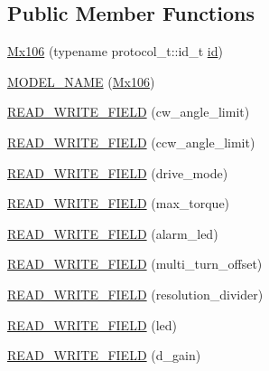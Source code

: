 \subsection*{Public Member Functions}
\begin{DoxyCompactItemize}
\item 
\hyperlink{classdynamixel_1_1servos_1_1_mx106_a184741dcdff7d84954ade3e11991950d}{Mx106} (typename protocol\+\_\+t\+::id\+\_\+t \hyperlink{classdynamixel_1_1servos_1_1_servo_a2d022081672e25a7bb57b76706e1cc57}{id})
\item 
\hyperlink{classdynamixel_1_1servos_1_1_mx106_a62132a7010a8803253cd6733c2a4c348}{M\+O\+D\+E\+L\+\_\+\+N\+A\+M\+E} (\hyperlink{classdynamixel_1_1servos_1_1_mx106}{Mx106})
\item 
\hyperlink{classdynamixel_1_1servos_1_1_mx106_a51923345707aaaf521c92db51b046ad3}{R\+E\+A\+D\+\_\+\+W\+R\+I\+T\+E\+\_\+\+F\+I\+E\+L\+D} (cw\+\_\+angle\+\_\+limit)
\item 
\hyperlink{classdynamixel_1_1servos_1_1_mx106_a0ff6915f624e389fb1084d510b127f89}{R\+E\+A\+D\+\_\+\+W\+R\+I\+T\+E\+\_\+\+F\+I\+E\+L\+D} (ccw\+\_\+angle\+\_\+limit)
\item 
\hyperlink{classdynamixel_1_1servos_1_1_mx106_a9832c95a40e9f62debd1e3b7af152ea7}{R\+E\+A\+D\+\_\+\+W\+R\+I\+T\+E\+\_\+\+F\+I\+E\+L\+D} (drive\+\_\+mode)
\item 
\hyperlink{classdynamixel_1_1servos_1_1_mx106_acb865eeab49a936e12f4fc7860f5bc56}{R\+E\+A\+D\+\_\+\+W\+R\+I\+T\+E\+\_\+\+F\+I\+E\+L\+D} (max\+\_\+torque)
\item 
\hyperlink{classdynamixel_1_1servos_1_1_mx106_a5449c62f52d39a641bef1ed2595aa4e6}{R\+E\+A\+D\+\_\+\+W\+R\+I\+T\+E\+\_\+\+F\+I\+E\+L\+D} (alarm\+\_\+led)
\item 
\hyperlink{classdynamixel_1_1servos_1_1_mx106_ac6664ff789a4d28db9e0a9e3370c1670}{R\+E\+A\+D\+\_\+\+W\+R\+I\+T\+E\+\_\+\+F\+I\+E\+L\+D} (multi\+\_\+turn\+\_\+offset)
\item 
\hyperlink{classdynamixel_1_1servos_1_1_mx106_a0346932faf6dfd8f3a9598c5966560f9}{R\+E\+A\+D\+\_\+\+W\+R\+I\+T\+E\+\_\+\+F\+I\+E\+L\+D} (resolution\+\_\+divider)
\item 
\hyperlink{classdynamixel_1_1servos_1_1_mx106_a90c9736060b38f693e8b3c5c7078decd}{R\+E\+A\+D\+\_\+\+W\+R\+I\+T\+E\+\_\+\+F\+I\+E\+L\+D} (led)
\item 
\hyperlink{classdynamixel_1_1servos_1_1_mx106_a04f540f8b24808e523c0f9b4159f3ee6}{R\+E\+A\+D\+\_\+\+W\+R\+I\+T\+E\+\_\+\+F\+I\+E\+L\+D} (d\+\_\+gain)
\item 

\end{DoxyCompactItemize}
